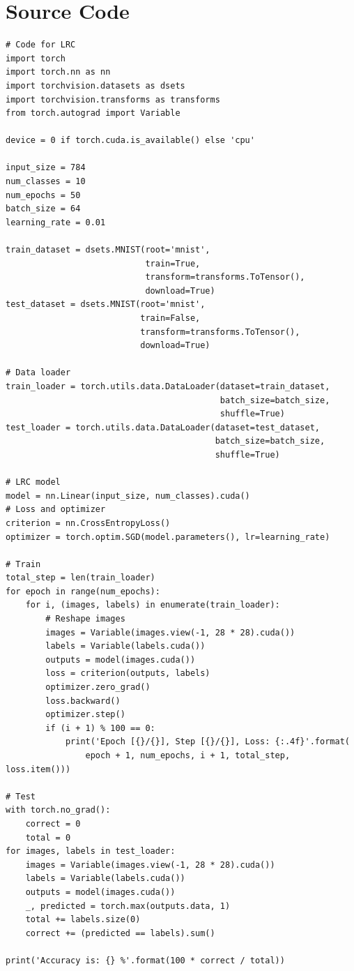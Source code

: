 \documentclass{article}
\begin{document}
\section{Source Code}
\begin{lstlisting}
# Code for LRC
import torch
import torch.nn as nn
import torchvision.datasets as dsets
import torchvision.transforms as transforms
from torch.autograd import Variable

device = 0 if torch.cuda.is_available() else 'cpu'

input_size = 784
num_classes = 10
num_epochs = 50 
batch_size = 64
learning_rate = 0.01

train_dataset = dsets.MNIST(root='mnist',
                            train=True,
                            transform=transforms.ToTensor(),
                            download=True)
test_dataset = dsets.MNIST(root='mnist',
                           train=False,
                           transform=transforms.ToTensor(),
                           download=True)

# Data loader
train_loader = torch.utils.data.DataLoader(dataset=train_dataset,
                                           batch_size=batch_size,
                                           shuffle=True)
test_loader = torch.utils.data.DataLoader(dataset=test_dataset,
                                          batch_size=batch_size,
                                          shuffle=True)

# LRC model
model = nn.Linear(input_size, num_classes).cuda()
# Loss and optimizer
criterion = nn.CrossEntropyLoss()
optimizer = torch.optim.SGD(model.parameters(), lr=learning_rate)

# Train
total_step = len(train_loader)
for epoch in range(num_epochs):
    for i, (images, labels) in enumerate(train_loader):
        # Reshape images
        images = Variable(images.view(-1, 28 * 28).cuda())
        labels = Variable(labels.cuda())
        outputs = model(images.cuda())
        loss = criterion(outputs, labels)
        optimizer.zero_grad()
        loss.backward()
        optimizer.step()
        if (i + 1) % 100 == 0:
            print('Epoch [{}/{}], Step [{}/{}], Loss: {:.4f}'.format(
                epoch + 1, num_epochs, i + 1, total_step, loss.item()))

# Test
with torch.no_grad():
    correct = 0
    total = 0
for images, labels in test_loader:
    images = Variable(images.view(-1, 28 * 28).cuda())
    labels = Variable(labels.cuda())
    outputs = model(images.cuda())
    _, predicted = torch.max(outputs.data, 1)
    total += labels.size(0)
    correct += (predicted == labels).sum()

print('Accuracy is: {} %'.format(100 * correct / total))
\end{lstlisting}
\end{document}
